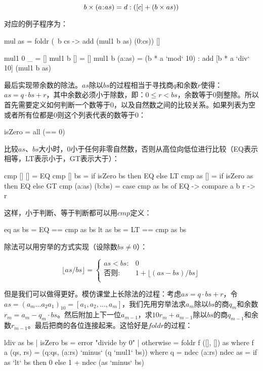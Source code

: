 \documentclass[b5paper]{ctexart}
\begin{document}
\begin{Answer}[ref = {ex:list-others}]
{\[
b \times (a \mathbin{\!:\!} as) = d : ([c] + (b \times as))
\]

对应的例子程序为：

\begin{Haskell}
mul as = foldr (\ b cs -> add (mul1 b as) (0:cs)) []

mul1 0 _ = []
mul1 b [] = []
mul1 b (a:as) = (b * a `mod` 10) : add [b * a `div` 10] (mul1 b as)
\end{Haskell}

最后实现带余数的除法。$as$除以$bs$的过程相当于寻找商$q$和余数$r$使得：$as = q \cdot bs + r$，其中余数必须小于除数，即：$0 \leq r < bs$，余数等于0则整除。所以首先需要定义如何判断一个数等于0，以及自然数之间的比较关系。如果列表为空或者所有位都是0则这个列表代表的数等于0：

\begin{Haskell}
isZero = all (== 0)
\end{Haskell}

比较$as$、$bs$大小时，0小于任何非零自然数，否则从高位向低位进行比较（EQ表示相等，LT表示小于，GT表示大于）：

\begin{Haskell}
cmp [] [] = EQ
cmp [] bs = if isZero bs then EQ else LT
cmp as [] = if isZero as then EQ else GT
cmp (a:as) (b:bs) = case cmp as bs of EQ -> compare a b
                                      r -> r
\end{Haskell}

这样，小于判断、等于判断都可以用$cmp$定义：

\begin{Haskell}
eq as bs = EQ == cmp as bs
lt as bs = LT == cmp as bs
\end{Haskell}

除法可以用穷举的方式实现（设除数$bs \neq 0$）：

\[
\lfloor as / bs \rfloor = \begin{cases}
as < bs: & 0 \\
\text{否则}: & 1 + \lfloor (as - bs) / bs \rfloor \\
\end{cases}
\]

但是我们可以做得更好。模仿课堂上长除法的过程：考虑$as = q \cdot bs + r$，令$as = (a_m...a_2a_1)_{10} = [a_1, a_2, ..., a_m]$，我们先用穷举法求$a_m$除以$bs$的商$q_m$和余数$r_m = a_m - q_m \cdot bs$。然后附加上下一位$a_{m-1}$，求$10 r_{m} + a_{m-1}$除以$bs$的商$q_{m-1}$和余数$r_{m-1}$。最后把商的各位连接起来。这恰好是$foldr$的过程：

\begin{Haskell}
ldiv as bs | isZero bs = error "divide by 0"
           | otherwise = foldr f ([], []) as where
  f a (qs, rs) = (q:qs, (a:rs) `minus` (q `mul1` bs)) where
    q =  ndec (a:rs)
  ndec as = if as `lt` bs then 0 else 1 + ndec (as `minus` bs)
\end{Haskell}
}


\end{Answer}
\end{document}
